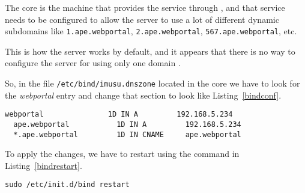 The  core is the machine that provides the  service through , and that service needs to be configured to allow the  server to use a lot of different dynamic subdomains like \verb|1.ape.webportal|, \verb|2.ape.webportal|, \verb|567.ape.webportal|, etc.

This is how the  server works by default, and it appears that there is no way to configure the  server for using only one domain \cite{ApeConfig}.

So, in the file \verb|/etc/bind/imusu.dnszone| located in the  core
we have to look for the \emph{webportal} entry and change that section to look
like Listing~\vref{bindconf}.

\begin{lstlisting}[label=bindconf,caption=BIND configuration]
  webportal               1D IN A         192.168.5.234
  ape.webportal           1D IN A         192.168.5.234
  *.ape.webportal         1D IN CNAME     ape.webportal
\end{lstlisting}

To apply the changes, we have to restart  using the command in
Listing~\vref{bindrestart}.

\begin{lstlisting}[label=bindrestart,caption=BIND restart command]
  sudo /etc/init.d/bind restart
\end{lstlisting}
